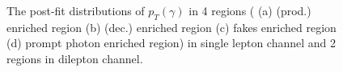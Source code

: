 \begin{figure}[ht]
  \quad \quad
  \quad\quad

  \caption{The post-fit distributions of $p_T(\gamma)$ in 4 regions ( (a) \tty (prod.) enriched region  (b) \tty (dec.) enriched region
  (c) fakes enriched region (d) prompt photon enriched region) in single lepton channel and 2 regions in dilepton channel. }
  \label{fig:pt_postfit_sldl_realdata}
\end{figure}
\FloatBarrier


